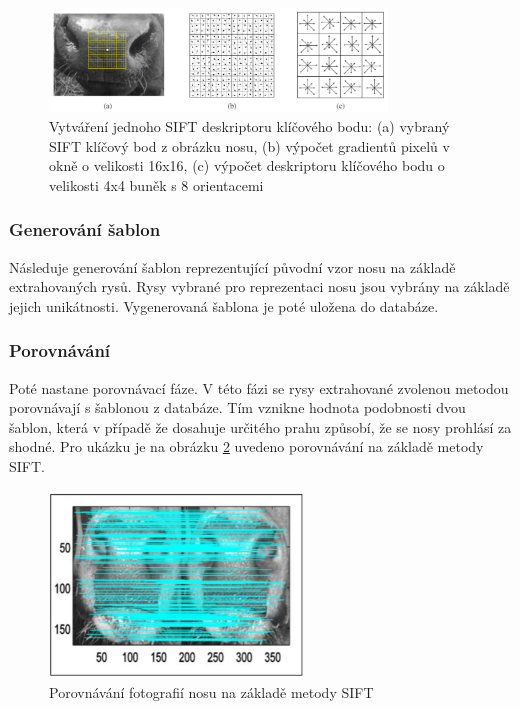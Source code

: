 \begin{figure}[h]
	\centering
	\includegraphics[width=0.8\textwidth]{obrazky/sift.png}
	\caption{Vytváření jednoho SIFT deskriptoru klíčového bodu: (a) vybraný SIFT klíčový bod z obrázku nosu, (b) výpočet gradientů pixelů v okně o velikosti 16x16, (c) výpočet deskriptoru klíčového bodu o velikosti 4x4 buněk s 8 orientacemi  \cite{cattle_recognition_paper}}
	\label{sift}
\end{figure}


\subsubsection{Generování šablon}
Následuje generování šablon reprezentující původní vzor nosu na základě extrahovaných rysů. Rysy vybrané pro reprezentaci nosu jsou vybrány na základě jejich unikátnosti. Vygenerovaná šablona je poté uložena do databáze.

\subsubsection{Porovnávání}
Poté nastane porovnávací fáze. V této fázi se rysy extrahované zvolenou metodou  porovnávají s šablonou z databáze. Tím vznikne hodnota podobnosti dvou šablon, která v případě že dosahuje určitého prahu způsobí, že se nosy prohlásí za shodné. Pro ukázku je na obrázku \ref{sift_match} uvedeno porovnávání na základě metody SIFT.

\begin{figure}[h]
	\centering
	\includegraphics[width=0.6\textwidth]{obrazky/sift_match.png}
	\caption{Porovnávání fotografií nosu na základě metody SIFT \cite{cattle_recognition_paper}}
	\label{sift_match}
\end{figure}

